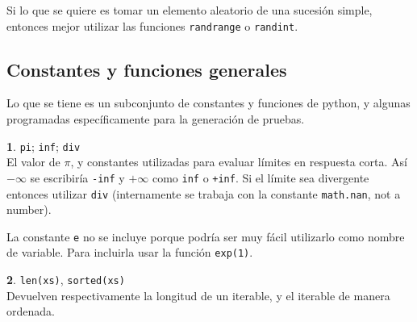 \documentclass[12pt]{article}
\theoremstyle{definition}
\newtheorem{funcion}{}[section]
\begin{document}
Si lo que se quiere es tomar un elemento aleatorio de una sucesión simple, entonces mejor utilizar las funciones \verb|randrange| o \verb|randint|. 

\subsection{Constantes y funciones generales}
Lo que se tiene es un subconjunto de constantes y funciones de python, y algunas programadas espec\'ificamente para la generaci\'on de pruebas.

\begin{funcion}
\verb|pi|; \verb|inf|; \verb|div| \\[1ex]
  El valor de $\pi$, y constantes utilizadas para evaluar l\'imites en respuesta corta. As\'i $-\infty$ se escribir\'ia \verb|-inf| y $+\infty$ como \verb|inf| o \verb|+inf|. Si el l\'imite sea divergente entonces utilizar \verb|div| (internamente se trabaja con la constante \verb|math.nan|, not a number).

  La constante \verb|e| no se incluye porque podr\'ia ser muy f\'acil utilizarlo como nombre de variable. Para incluirla usar la funci\'on \verb|exp(1)|.
\end{funcion}

\begin{funcion}
  \verb|len(xs)|, \verb|sorted(xs)| \\[1ex]
  Devuelven respectivamente la longitud de un iterable, y el iterable de manera ordenada.
\end{funcion}
\end{document}
